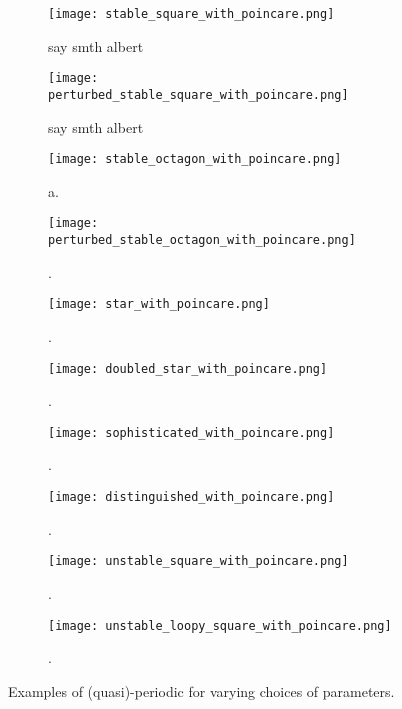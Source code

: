 \begin{figure}[!th]
\centering
\begin{subfigure}{0.49\textwidth}
\centering
\texttt{[image: stable\_square\_with\_poincare.png]}
\caption{say smth albert}
\label{subfig:periodicorbit1}
\end{subfigure}
%
\begin{subfigure}{0.49\textwidth}
\texttt{[image: perturbed\_stable\_square\_with\_poincare.png]}
\caption{say smth albert}
\label{subfig:periodicorbit2}
\end{subfigure}
%
\begin{subfigure}{0.49\textwidth}
\texttt{[image: stable\_octagon\_with\_poincare.png]}
\caption{a.}
\label{subfig:periodicorbit3}
\end{subfigure}
%
\begin{subfigure}{0.49\textwidth}
\texttt{[image: perturbed\_stable\_octagon\_with\_poincare.png]}
\caption{.}
\label{subfig:periodicorbit4}
\end{subfigure}
%
\begin{subfigure}{0.49\textwidth}
\texttt{[image: star\_with\_poincare.png]}
\caption{.}
\label{subfig:periodicorbit5}
\end{subfigure}
%
\begin{subfigure}{0.49\textwidth}
\texttt{[image: doubled\_star\_with\_poincare.png]}
\caption{.}
\label{subfig:periodicorbit6}
\end{subfigure}
%
\begin{subfigure}{0.49\textwidth}
\texttt{[image: sophisticated\_with\_poincare.png]}
\caption{.}
\label{subfig:periodicorbit7}
\end{subfigure}
%
\begin{subfigure}{0.49\textwidth}
\texttt{[image: distinguished\_with\_poincare.png]}
\caption{.}
\label{subfig:periodicorbit8}
\end{subfigure}
%
\begin{subfigure}{0.49\textwidth}
\texttt{[image: unstable\_square\_with\_poincare.png]}
\caption{.}
\label{subfig:periodicorbit9}
\end{subfigure}
%
\begin{subfigure}{0.49\textwidth}
\texttt{[image: unstable\_loopy\_square\_with\_poincare.png]}
\caption{.}
\label{subfig:periodicorbit10}
\end{subfigure}
\caption{Examples of (quasi)-periodic for varying choices of parameters.}
\label{fig:periodicorbits}
\end{figure}


